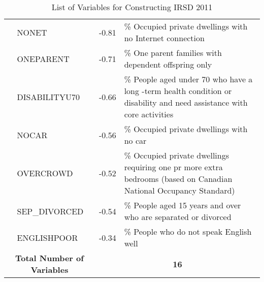 \begin{table}[t]
{\begin{tabular}{c p{}c p{}}
                        & NONET                          & -0.81            & \% Occupied private dwellings   with no Internet connection                                                               \\ \cline{2-4}
                        & ONEPARENT                      & -0.71            & \% One parent families with   dependent offspring only                                                                    \\ \cline{2-4}
                        & DISABILITYU70                  & -0.66            & \% People aged under 70 who have   a long -term health condition or disability and need assistance with core   activities \\ \cline{2-4}
                        & NOCAR                          & -0.56            & \% Occupied private dwellings   with no car                                                                               \\ \cline{2-4}
                        & OVERCROWD                      & -0.52            & \% Occupied private dwellings   requiring one pr more extra bedrooms (based on Canadian National Occupancy   Standard)    \\ \cline{2-4}
                        & SEP\_DIVORCED                  & -0.54            & \% People aged 15 years and over   who are separated or divorced                                                          \\ \cline{2-4}
                        & ENGLISHPOOR                    & -0.34            & \% People who do not speak   English well                                                                                 \\ \hline
\multicolumn{2}{c}{\textbf{Total Number   of Variables}} & \multicolumn{2}{c}{\textbf{16}}                                                                                                              \\ \hline
\end{tabular}
}
\caption{List of Variables for Constructing IRSD 2011}
\label{tbl-IRSDloading11}
\end{table}
